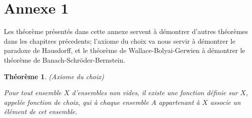 \chapter*{Annexe 1}
\newtheorem{kkk}{Théorème}
\newtheorem{li}{Lemme}

\makeatletter
\renewcommand{\thesection}{\@arabic\c@section}
\makeatother

\setcounter{section}{0}
Les théorème présentés dans cette annexe servent à démontrer d'autres théorèmes dans les chapitres précedents; l'axiome du choix va nous servir à démontrer le paradoxe de Hausdorff, et le théorème de Wallace-Bolyai-Gerwien à démontrer le théorème de Banach-Schröder-Bernstein.
\begin{kkk}(Axiome du choix)\cite{cite5}
  \hfill

\noindent
  Pour tout ensemble $X$ d'ensembles non vides, il existe une fonction définie sur $X$, appelée fonction de choix, qui à chaque ensemble $A$ appartenant à $X$ associe un élément de cet ensemble.
  \label{axiome}
\end{kkk}

